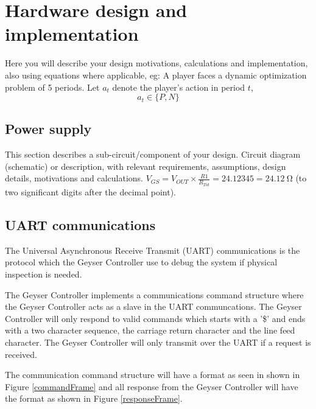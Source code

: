 \documentclass[11pt,a4paper]{article}
\begin{document}
\section{Hardware design and implementation}
Here you will describe your design motivations, calculations and implementation, also using equations where applicable, eg: A player faces a dynamic optimization problem of 5 periods. Let $a_t$ denote the player's action in period $t$,
\begin{equation}
	a_t \in \{P,N\}
\end{equation}

\subsection{Power supply}
This section describes a sub-circuit/component of your design. Circuit diagram (schematic) or description, with relevant requirements, assumptions, design details, motivations and calculations. $V_{GS} = V_{OUT} \times \frac{R1}{R_{Tot}} = 24.12345 = \SI{24.12}{\ohm}$ (to two significant digits after the decimal point).

\subsection{UART communications}
The Universal Asynchronous Receive Transmit (UART) communications is the protocol which the Geyser Controller use to debug the system if physical inspection is needed. 

The Geyser Controller implements a communications command structure where the Geyser Controller acts as a slave in the UART communcations. The Geyser Controller will only respond to valid commands which starts with a '\$' and ends with a two character sequence, the carriage return character and the line feed character.  The Geyser Controller will  only transmit over the UART if a request is received. 

The communication command structure will have  a format as seen in shown in Figure \ref{commandFrame} and all response from the Geyser Controller will have the format as shown in Figure \ref{responseFrame}.
\end{document}
